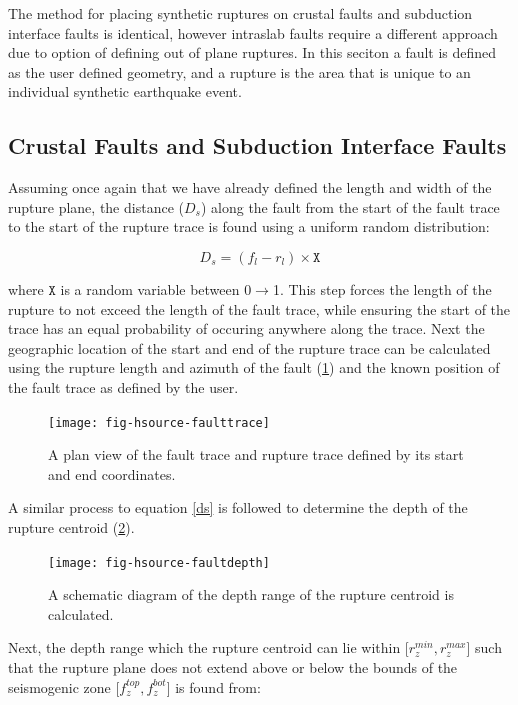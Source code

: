 The method for placing synthetic ruptures on crustal faults and subduction interface faults is identical, however intraslab faults require a 
different approach due to option of defining out of plane ruptures. In this seciton a fault is defined as the user defined geometry, and
a rupture is the area that is unique to an individual synthetic earthquake event. \\

\subsection{Crustal Faults and Subduction Interface Faults}
Assuming once again that we have already defined the length and width of the rupture plane, the distance ($D_s$) along the fault from the start of the fault trace to
the start of the rupture trace is found using a uniform random distribution:

\begin{equation} \label{eq:ds}
D_s = (f_l - r_l) \times \mathtt{X}
\end{equation}

where $\mathtt{X}$ is a random variable between 0$\rightarrow$1. This step forces the length of the rupture to not exceed the length of the fault trace, while 
ensuring the start of the trace has an equal probability of occuring anywhere along the trace. Next the geographic location of the start and end of the rupture trace can be 
calculated using the rupture length and azimuth of the fault (\ref{fig:traces}) and the known position of the fault trace as defined by the user. 

\begin{figure}[htp]
\centerline{\texttt{[image: fig-hsource-faulttrace]}}
\caption{A plan view of the fault trace and rupture trace defined by its start and end coordinates.}
\label{fig:traces}
\end{figure}

A similar process to equation \ref{ds} is followed to determine the depth of the rupture centroid (\ref{fig:rzrange}). 

\begin{figure}[htp]
\centerline{\texttt{[image: fig-hsource-faultdepth]}}
\caption{A schematic diagram of the depth range of the rupture centroid is calculated.}
\label{fig:rzrange}
\end{figure}

Next, the depth range which the rupture centroid can lie within [$r_z^{min}, r_z^{max}$] such that 
the rupture plane does not extend above or below the bounds of the seismogenic zone [$f_z^{top}, f_z^{bot}$] is found from:

